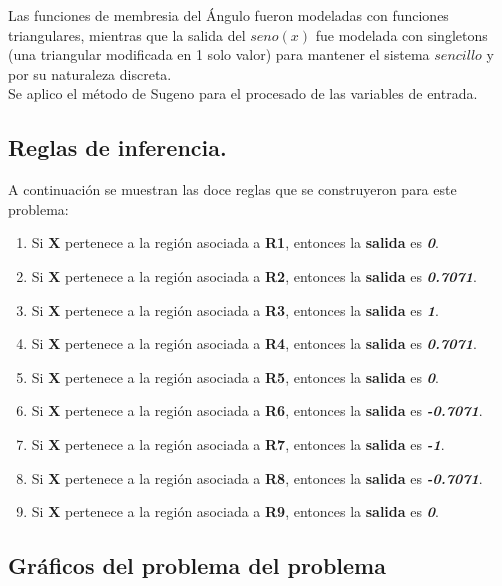 \documentclass[11pt, letterpaper]{article}
\begin{document}
\newpage 

Las funciones de membresia del Ángulo fueron modeladas con funciones triangulares, mientras que la salida del $seno(x)$ fue modelada con singletons (una triangular modificada en 1 solo valor) para mantener el sistema $sencillo$ y por su naturaleza discreta. \\

Se aplico el método de Sugeno para el procesado de las variables de entrada. 

\newpage

\subsection{Reglas de inferencia.}

A continuación se muestran las doce reglas que se construyeron para este problema:

\begin{enumerate}
	\item Si \textbf{X} pertenece a la región asociada a \textbf{R1}, entonces la \textbf{salida} es \textbf{\textit{0}}.
	\item Si \textbf{X} pertenece a la región asociada a \textbf{R2}, entonces la \textbf{salida} es \textbf{\textit{0.7071}}.
	\item Si \textbf{X} pertenece a la región asociada a \textbf{R3}, entonces la \textbf{salida} es \textbf{\textit{1}}.
	\item Si \textbf{X} pertenece a la región asociada a \textbf{R4}, entonces la \textbf{salida} es \textbf{\textit{0.7071}}.
	\item Si \textbf{X} pertenece a la región asociada a \textbf{R5}, entonces la \textbf{salida} es \textbf{\textit{0}}.
	\item Si \textbf{X} pertenece a la región asociada a \textbf{R6}, entonces la \textbf{salida} es \textbf{\textit{-0.7071}}.
	\item Si \textbf{X} pertenece a la región asociada a \textbf{R7}, entonces la \textbf{salida} es \textbf{\textit{-1}}.
	\item Si \textbf{X} pertenece a la región asociada a \textbf{R8}, entonces la \textbf{salida} es \textbf{\textit{-0.7071}}.
	\item Si \textbf{X} pertenece a la región asociada a \textbf{R9}, entonces la \textbf{salida} es \textbf{\textit{0}}.
\end{enumerate}
\newpage

\subsection{Gráficos del problema del problema}
\end{document}
